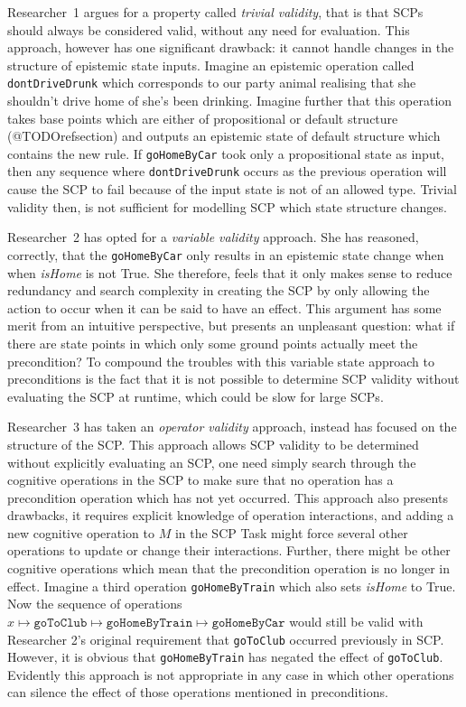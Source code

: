 Researcher~1 argues for a property called \textit{trivial validity}, that is that SCPs should always be considered valid, without any need for evaluation. This approach, however has one significant drawback: it cannot handle changes in the structure of epistemic state inputs. Imagine an epistemic operation called \texttt{dontDriveDrunk} which corresponds to our party animal realising that she shouldn't drive home of she's been drinking. Imagine further that this operation takes base points which are either of propositional or default structure (@TODOrefsection) and outputs an epistemic state of default structure which contains the new rule. If \texttt{goHomeByCar} took only a propositional state as input, then any sequence where \texttt{dontDriveDrunk} occurs as the previous operation will cause the SCP to fail because of the input state is not of an allowed type. Trivial validity then, is not sufficient for modelling SCP which state structure changes.

Researcher~2 has opted for a \textit{variable validity} approach. She has reasoned, correctly, that the \texttt{goHomeByCar} only results in an epistemic state change when when \textit{isHome} is not True. She therefore, feels that it only makes sense to reduce redundancy and search complexity in creating the SCP by only allowing the action to occur when it can be said to have an effect. This argument has some merit from an intuitive perspective, but presents an unpleasant question: what if there are state points in which only some ground points actually meet the precondition? To compound the troubles with this variable state approach to preconditions is the fact that it is not possible to determine SCP validity without evaluating the SCP at runtime, which could be slow for large SCPs.

Researcher~3 has taken an \textit{operator validity} approach, instead has focused on the structure of the SCP. This approach allows SCP validity to be determined without explicitly evaluating an SCP, one need simply search through the cognitive operations in the SCP to make sure that no operation has a precondition operation which has not yet occurred. This approach also presents drawbacks, it requires explicit knowledge of operation interactions, and adding a new cognitive operation to $M$ in the SCP Task might force several other operations to update or change their interactions. Further, there might be other cognitive operations which mean that the precondition operation is no longer in effect. Imagine a third operation \texttt{goHomeByTrain} which also sets \textit{isHome} to True. Now the sequence of operations $x\longmapsto \texttt{goToClub} \longmapsto \texttt{goHomeByTrain} \longmapsto \texttt{goHomeByCar}$ would still be valid with Researcher 2's original requirement that  \texttt{goToClub} occurred previously in SCP. However, it is obvious that \texttt{goHomeByTrain} has negated the effect of \texttt{goToClub}. Evidently this approach is not appropriate in any case in which other operations can silence the effect of those operations mentioned in preconditions.

